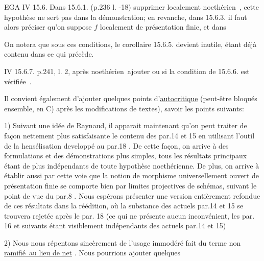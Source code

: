 EGA IV 15.6. Dans 15.6.1. (p.236 l. -18) supprimer \textquotedbl localement
noethérien\textquotedbl\ , cette hypothèse ne sert pas dans la démonstration; en revanche, dans 15.6.3.  il faut alors préciser qu'on suppose $f$ localement
de présentation finie, et dans 

\handwritten{$\Bigg($}On notera que sous ces conditions, le  corollaire 15.6.5.
devient inutile, étant déjà contenu dans ce qui précède.

IV 15.6.7. p.241, l. 2, après \textquotedbl noethérien\textquotedbl\ ajouter \textquotedbl ou si la condition
 de 15.6.6. est vérifiée\textquotedbl\ .

Il convient également d'ajouter quelques points d'\uline{autocritique}
(peut-être bloqués ensemble, en C) après les \textquotedbl modifications de textes),
savoir les points suivants:

1\textordmasculine) Suivant une idée de Raynaud, il apparait maintenant qu'on peut
traiter de façon nettement plus satisfaisante le contenu des par.14 et
15 en utilisant l'outil de la hensélisation developpé au par.18 .
De cette façon, on arrive à des formulations et des démonstrations plus
simples, tous les résultats principaux étant de plus indépendants de toute hypothèse noethérienne. De plus, on arrive à établir aussi par cette
voie que la notion de morphisme universellement ouvert  de
présentation finie se comporte bien par limites projectives de schémas,
suivant le point de vue du par.8 . Nous espérons présenter une version
entièrement refondue de ces résultats dans la réédition, où 
la substance des actuels par.14 et 15 se trouvera rejetée après le par.
18 (ce qui ne présente aucun inconvénient, les par. 16 et suivants
étant visiblement indépendants des actuels par.14 et 15)

2\textordmasculine) Nous nous répentons sincèrement de l'usage immodéré fait du
terme \textquotedbl non \uline{ramifié\textquotedbl\ au lieu de \textquotedbl net\textquotedbl} . Nous pourrions ajouter quelques

